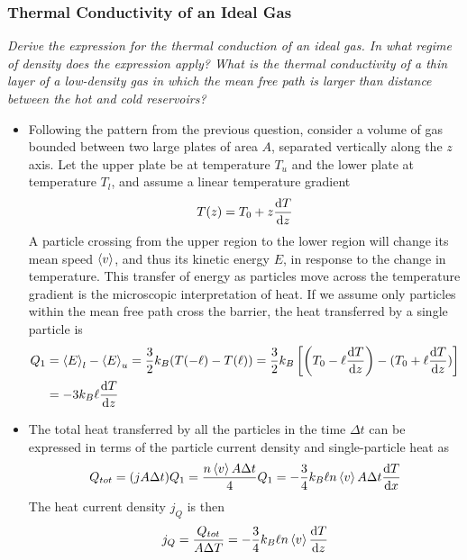 \documentclass[11pt, a4paper]{article}
\begin{document}
\subsubsection{Thermal Conductivity of an Ideal Gas}
\textit{Derive the expression for the thermal conduction of an ideal gas. In what regime of density does the expression apply? What is the thermal conductivity of a thin layer of a low-density gas in which the mean free path is larger than distance between the hot and cold reservoirs?}

\begin{itemize}
	\item Following the pattern from the previous question, consider a volume of gas bounded between two large plates of area $ A $, separated vertically along the $ z $ axis. Let the upper plate be at temperature $ T_{u} $ and the lower plate at temperature $ T_{l} $, and assume a linear temperature gradient
	\begin{equation*}
		T(z) = T_{0} + z \dv{T}{z}
	\end{equation*}
	A particle crossing from the upper region to the lower region will change its mean speed $ \expval{v} $, and thus its kinetic energy $ E $, in response to the change in temperature. This transfer of energy as particles move across the temperature gradient is the microscopic interpretation of heat. If we assume only particles within the mean free path cross the barrier, the heat transferred by a single particle is
	\begin{align*}
		Q_{1} &= \expval{E}_{l} - \expval{E}_{u} = \frac{3}{2}k_{B} (T(-\ell) - T(\ell)) = \frac{3}{2}k_{B}  \left[\left(T_{0} -\ell \dv{T}{z}\right) - (T_{0} + \ell \dv{T}{z})\right] \\
		&= -3 k_{B} \ell \dv{T}{z}
	\end{align*}
	
	\item The total heat transferred by all the particles in the time $ \Delta t $ can be expressed in terms of the particle current density and single-particle heat as
	\begin{equation*}
		Q_{tot} = (j A \Delta t) Q_{1} = \frac{n \expval{v} A \Delta t}{4}Q_{1} = - \frac{3}{4}  k_{B} \ell n \expval{v} A \Delta t\dv{T}{x}
	\end{equation*}
	The heat current density $ j_{Q} $ is then
	\begin{equation*}
		j_{Q} = \frac{Q_{tot}}{A \Delta T} = - \frac{3}{4}  k_{B} \ell n \expval{v} \dv{T}{z}
	\end{equation*}
	

\end{itemize}
\end{document}
